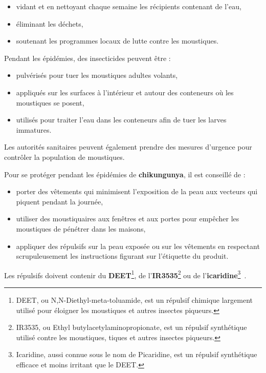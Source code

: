 \begin{itemize}
	\item vidant et en nettoyant chaque semaine les récipients contenant de l'eau,
	\item éliminant les déchets,
	\item soutenant les programmes locaux de lutte contre les moustiques.
\end{itemize}

Pendant les épidémies, des insecticides peuvent être :

\begin{itemize}
	\item pulvérisés pour tuer les moustiques adultes volants,
	\item appliqués sur les surfaces à l'intérieur et autour des conteneurs où les moustiques se posent,
	\item utilisés pour traiter l'eau dans les conteneurs afin de tuer les larves immatures.
\end{itemize}

Les autorités sanitaires peuvent également prendre des mesures d'urgence pour contrôler la population de moustiques.

Pour se protéger pendant les épidémies de \textbf{chikungunya}, il est conseillé de :

\begin{itemize}
	\item porter des vêtements qui minimisent l'exposition de la peau aux vecteurs qui piquent pendant la journée,
	\item utiliser des moustiquaires aux fenêtres et aux portes pour empêcher les moustiques de pénétrer dans les maisons,
	\item appliquer des répulsifs sur la peau exposée ou sur les vêtements en respectant scrupuleusement les instructions figurant sur l'étiquette du produit.
\end{itemize}

Les répulsifs doivent contenir du \textbf{DEET}\footnote{DEET, ou N,N-Diethyl-meta-toluamide, est un répulsif chimique largement utilisé pour éloigner les moustiques et autres insectes piqueurs.}, de l'\textbf{IR3535}\footnote{IR3535, ou Ethyl butylacetylaminopropionate, est un répulsif synthétique utilisé contre les moustiques, tiques et autres insectes piqueurs.} ou de l'\textbf{icaridine}\footnote{Icaridine, aussi connue sous le nom de Picaridine, est un répulsif synthétique efficace et moins irritant que le DEET.}~\cite{origin}.


